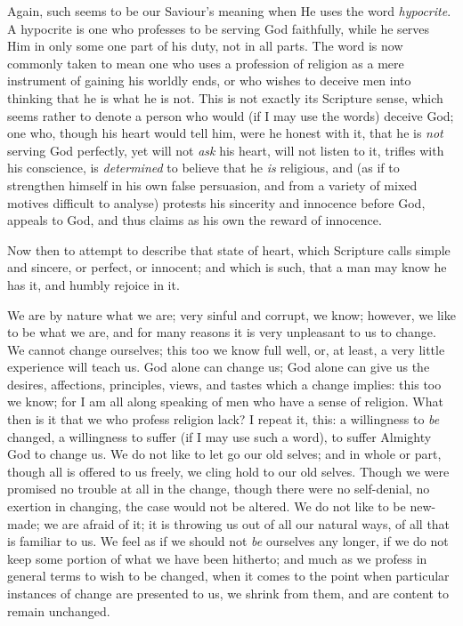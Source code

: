 Again, such seems to be our Saviour's meaning when He uses the word
\emph{hypocrite}. A hypocrite is one who professes to be serving God
faithfully, while he serves Him in only some one part of his duty, not
in all parts. The word is now commonly taken to mean one who uses a
profession of religion as a mere instrument of gaining his worldly
ends, or who wishes to deceive men into thinking that he is what he is
not. This is not exactly its Scripture sense, which seems rather to
denote a person who would (if I may use the words) deceive God; one
who, though his heart would tell him, were he honest with it, that he
is \emph{not} serving God perfectly, yet will not \emph{ask} his
heart, will not listen to it, trifles with his conscience, is \emph{determined}
to believe that he \emph{is} religious, and (as if to strengthen
himself in his own false persuasion, and from a variety of mixed
motives difficult to analyse) protests his sincerity and innocence
before God, appeals to God, and thus claims as his own the reward of
innocence.

Now then to attempt to describe that state of heart, which
Scripture calls simple and sincere, or perfect, or innocent; and which
is such, that a man may know he has it, and humbly rejoice in it.

We are by nature what we are; very sinful and corrupt, we know;
however, we like to be what we are, and for many reasons it is very
unpleasant to us to change. We cannot change ourselves; this too we
know full well, or, at least, a very little experience will teach us.
God alone can change us; God alone can give us the desires,
affections, principles, views, and tastes which a change implies: this
too we know; for I am all along speaking of men who have a sense of
religion. What then is it that we who profess religion lack? I repeat
it, this: a willingness to \emph{be} changed, a willingness to suffer
(if I may use such a word), to suffer Almighty God to change us. We do
not like to let go our old selves; and in whole or part, though all is
offered to us freely, we cling hold to our old selves. Though we were
promised no trouble at all in the change, though there were no
self-denial, no exertion in changing, the case would not be altered.
We do not like to be new-made; we are afraid of it; it is throwing us
out of all our natural ways, of all that is familiar to us. We feel as
if we should not \emph{be} ourselves any longer, if we do not keep
some portion of what we have been hitherto; and much as we profess in
general terms to wish to be changed, when it comes to the point when
particular instances of change are presented to us, we shrink from
them, and are content to remain unchanged.

